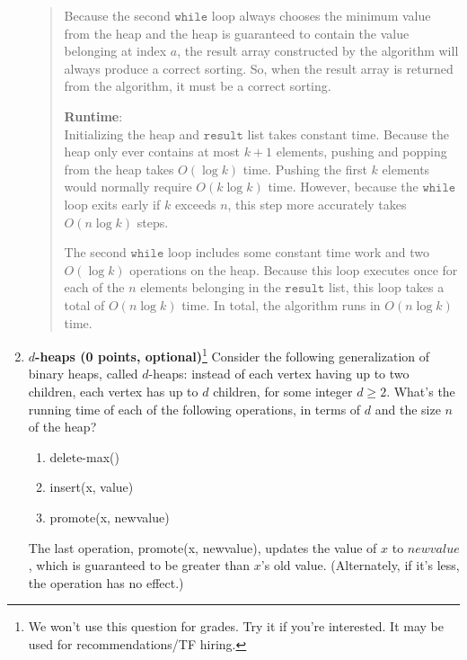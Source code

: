 \documentclass[11pt]{article}
\newcommand{\code}[1]{$\texttt{#1}$}
\begin{document}
\begin{enumerate}
\begin{quote}
      \medskip
      Because the second \code{while} loop always chooses the minimum value from the heap and the heap is guaranteed to contain the value belonging at index $a$, the result array constructed by the algorithm will always produce a correct sorting. So, when the result array is returned from the algorithm, it must be a correct sorting.

  \textbf{Runtime}: \\ 
  Initializing the heap and \code{result} list takes constant time. Because the heap only ever contains at most $k + 1$ elements, pushing and popping from the heap takes $O(\log k)$ time. Pushing the first $k$ elements would normally require $O(k \log k)$ time. However, because the \code{while} loop exits early if $k$ exceeds $n$, this step more accurately takes $O(n \log k)$ steps.  

  \medskip
  The second \code{while} loop includes some constant time work and two $O(\log k)$ operations on the heap. Because this loop executes once for each of the $n$ elements belonging in the \code{result} list, this loop takes a total of $O(n \log k)$ time. In total, the algorithm runs in $O(n \log k)$ time.
\end{quote}

\item 
{\bf $d$-heaps (0 points, optional)}\footnote{We won't use this question for grades. Try it if you're interested. 
It may be used for recommendations/TF hiring.}
Consider the following generalization of binary heaps, called $d$-heaps: instead of each vertex having up to two children, each vertex has up to $d$ children, for some integer $d \ge 2$. What's the running time of each of the following operations, in terms of $d$ and the size $n$ of the heap?
\begin{enumerate}
\item delete-max()
\item insert(x, value)
\item promote(x, newvalue)
\end{enumerate}
The last operation, promote(x, newvalue), updates the value of $x$ to $newvalue$, which is guaranteed to be greater than $x$'s old value. (Alternately, if it's less, the operation has no effect.)


\end{enumerate}
\end{document}
